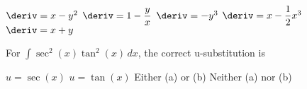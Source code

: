 \begin{questions}
    \begin{oneparchoices}
        \choice $\deriv = x - y^2$
        \choice $\deriv = 1 - \dfrac{y}{x}$
        \choice $\deriv = -y^3$
        \choice $\deriv = x - \dfrac{1}{2}x^3$
        \choice $\deriv = x + y$
    \end{oneparchoices} \par \horizontalline

    \question For $\int \sec^2 (x)\tan^2 (x) \, dx$, the correct u-substitution is \\

    \begin{oneparchoices}
        \choice $u = \sec (x)$ 
        \choice $u = \tan (x)$
        \choice Either (a) or (b)
        \choice Neither (a) nor (b)
    \end{oneparchoices} \par \horizontalline

    \newpage


\end{questions}

